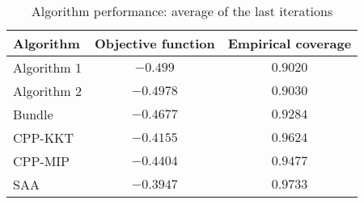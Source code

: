 \begin{table}[ht]
    \centering
    \begin{tabular}{lcc}
    \toprule
    \textbf{Algorithm} & \textbf{Objective function} & \textbf{Empirical coverage} \\
    \midrule
    Algorithm 1 & $-0.499$ & $0.9020$ \\
Algorithm 2 & $-0.4978$ & $0.9030$ \\
Bundle & $-0.4677$ & $0.9284$ \\
CPP-KKT & $-0.4155$ & $0.9624$ \\
CPP-MIP & $-0.4404$ & $0.9477$ \\
SAA & $-0.3947$ & $0.9733$ \\
\bottomrule
    \end{tabular}
    \caption{Algorithm performance: average of the last iterations}
    \end{table}